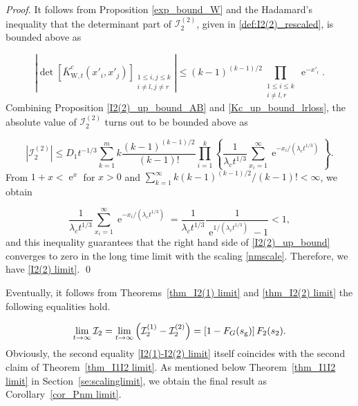 \documentclass[cmp]{svjour}
\numberwithin{theorem}{section}
\numberwithin{equation}{section}
\DeclareMathOperator{\e}{e}
\begin{document}
\begin{proof}

It follows from Proposition \ref{exp_bound_W} and the Hadamard's inequality that the determinant part of $\mathcal{I}_2^{(2)}$, given in \eqref{def:I2(2)_rescaled}, is bounded above as

\begin{equation}
\label{Kc_up_bound_lrloss}
\left| \det\left[ \bar{K}^c_{\mathrm{W},t}(x'_i, x'_j) \right]_{\substack{ 1 \leq i , j \leq k \\  i \neq l , j \neq r } } \right| \leq {(k - 1)}^{(k-1)/2} \prod_{\substack{ 1 \leq i \leq k \\  i \neq l,  r } }{ \e^{-x'_i} }.
\end{equation}
Combining Proposition \ref{I2(2)_up_bound_AB} and \eqref{Kc_up_bound_lrloss}, the absolute value of $\mathcal{I}_2^{(2)}$ turns out to be bounded above as

\begin{equation}\label{I2(2)_up_bound}
\left| \mathcal{I}_2^{(2)} \right| \leq D_1 t^{-1/3} \sum_{k=1}^{m}{ k \frac{ {(k-1)}^{(k-1)/2} }{(k-1)!} } \prod_{i = 1}^{k}{ \left\{ \frac{1}{\lambda_c t^{1/3}} \sum_{x_i = 1}^{\infty}{ \e^{ - {x_i}/{(\lambda_c t^{1/3})} } } \right\} }.
\end{equation}
From $1 + x < \e^x$ for $x>0$ and $\sum_{k=1}^{\infty}{ k {{(k-1)}^{(k-1)/2}} /{(k-1)!} } < \infty$, we obtain

\begin{equation*}
\frac{1}{\lambda_c t^{1/3}} \sum_{x_i = 1}^{\infty}{ \e^{ - {x_i}/{(\lambda_c t^{1/3})} } } =  \frac{1}{\lambda_c t^{1/3}} \frac{1}{\e^{1/{(\lambda_c t^{1/3})}} - 1} < 1,
\end{equation*}
and this inequality guarantees that the right hand side of \eqref{I2(2)_up_bound} converges to zero in the long time limit with the scaling \eqref{nmscale}.
Therefore, we have \eqref{I2(2) limit}.
\qed


\end{proof}

Eventually, it follows from Theorems~\ref{thm_I2(1) limit} and \ref{thm_I2(2) limit} the following equalities hold.

\begin{equation}
\label{I2(1)-I2(2) limit}
\lim_{t \to \infty} \mathcal{I}_2 = \lim_{t \to \infty} \left( \mathcal{I}^{(1)}_2 - \mathcal{I}^{(2)}_2 \right) = \left[ 1 - F_G(s_{\rm g}) \right] F_2(s_{2}).
\end{equation}
Obviously, the second equality \eqref{I2(1)-I2(2) limit} itself coincides with the second claim of Theorem~\ref{thm_I1I2 limit}.
As mentioned below Theorem~\ref{thm_I1I2 limit} in Section~\ref{se:scalinglimit}, we obtain the final result as Corollary~\ref{cor_Pnm limit}.
\end{document}
